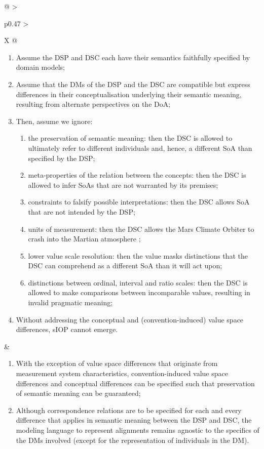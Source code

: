 \begin{xltabular}[l]{\linewidth}{@{} >{\small\raggedright\arraybackslash}p{0.47\linewidth} >{\small\raggedright\arraybackslash}X @{}}
\begin{enumerate}[left=6pt, nosep]
  \item Assume the DSP and DSC each have their semantics faithfully specified by domain models;
  \item Assume that the DMs of the DSP and the DSC are compatible but express differences in their conceptualisation underlying their semantic meaning, resulting from alternate perspectives on the DoA;
  \item Then, assume we ignore:
  \begin{enumerate}
    \item the preservation of semantic meaning: then the DSC is allowed to ultimately refer to different individuals and, hence, a different SoA than specified by the DSP; 
    \item meta-properties of the relation between the concepts: then the DSC is allowed to infer SoAs that are not warranted by its premises;
    \item constraints to falsify possible interpretations: then the DSC allows SoA that are not intended by the DSP; 
    \item units of measurement: then the DSC allows the Mars Climate Orbiter to crash into the Martian atmosphere \cite{Leveson2004};
    \item lower value scale resolution: then the value masks distinctions that the DSC can comprehend as a different SoA than it will act upon;
    \item distinctions between ordinal, interval and ratio scales: then the DSC is allowed to make comparisons between incomparable values, resulting in invalid pragmatic meaning;
  \end{enumerate}
  \item Without addressing the conceptual and (convention-induced) value space differences, sIOP cannot emerge.
\end{enumerate}
&
\begin{enumerate}[left=10pt, nosep]
  \item With the exception of value space differences that originate from measurement system characteristics, convention-induced value space differences and conceptual differences can be specified such that preservation of semantic meaning can be guaranteed;
  \item Although correspondence relations are to be specified for each and every difference that applies in semantic meaning between the DSP and DSC, the modeling language to represent alignments remains agnostic to the specifics of the DMs involved (except for the representation of individuals in the DM).

\end{enumerate}
\end{xltabular}
